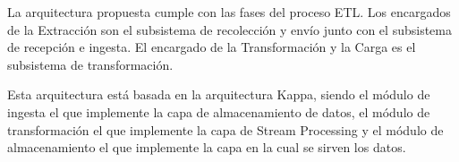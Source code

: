 La arquitectura propuesta cumple con las fases del proceso ETL. Los encargados de la Extracción son el subsistema de recolección y envío junto con el subsistema de recepción e ingesta. El encargado de la Transformación y la Carga es el subsistema de transformación.

Esta arquitectura está basada en la arquitectura Kappa\cite{Tfg:kappa}, siendo el módulo de ingesta el que implemente la capa de almacenamiento de datos, el módulo de transformación el que implemente la capa de Stream Processing y el módulo de almacenamiento el que implemente la capa en la cual se sirven los datos.

